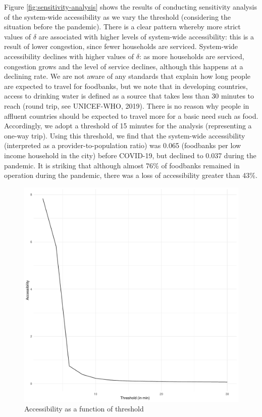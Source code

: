\documentclass[]{elsarticle} %
\begin{document}
Figure \ref{fig:sensitivity-analysis} shows the results of conducting
sensitivity analysis of the system-wide accessibility as we vary the
threshold (considering the situation before the pandemic). There is a
clear pattern whereby more strict values of \(\delta\) are associated
with higher levels of system-wide accessibility: this is a result of
lower congestion, since fewer households are serviced. System-wide
accessibility declines with higher values of \(\delta\): as more
households are serviced, congestion grows and the level of service
declines, although this happens at a declining rate. We are not aware of
any standards that explain how long people are expected to travel for
foodbanks, but we note that in developing countries, access to drinking
water is defined as a source that takes less than 30 minutes to reach
(round trip, see UNICEF-WHO, 2019). There is no reason why people in
affluent countries should be expected to travel more for a basic need
such as food. Accordingly, we adopt a threshold of 15 minutes for the
analysis (representing a one-way trip). Using this threshold, we find
that the system-wide accessibility (interpreted as a
provider-to-population ratio) was 0.065 (foodbanks per low income
household in the city) before COVID-19, but declined to 0.037 during the
pandemic. It is striking that although almost 76\% of foodbanks remained
in operation during the pandemic, there was a loss of accessibility
greater than 43\%.

\begin{figure}
\includegraphics[width=0.6\linewidth]{Accessibility-Foodbanks-Hamilton_files/figure-latex/plot-results-sensitivity-analysis-1} \caption{\label{fig:sensitivity-analysis}Accessibility as a function of threshold}\label{fig:plot-results-sensitivity-analysis}
\end{figure}
\end{document}
